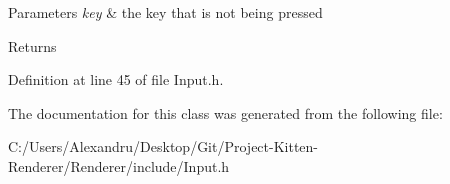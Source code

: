 \begin{DoxyParams}{Parameters}
{\em key} & the key that is not being pressed \\
\hline
\end{DoxyParams}
\begin{DoxyReturn}{Returns}

\end{DoxyReturn}


Definition at line 45 of file Input.\+h.



The documentation for this class was generated from the following file\+:\begin{DoxyCompactItemize}
\item 
C\+:/\+Users/\+Alexandru/\+Desktop/\+Git/\+Project-\/\+Kitten-\/\+Renderer/\+Renderer/include/Input.\+h\end{DoxyCompactItemize}
